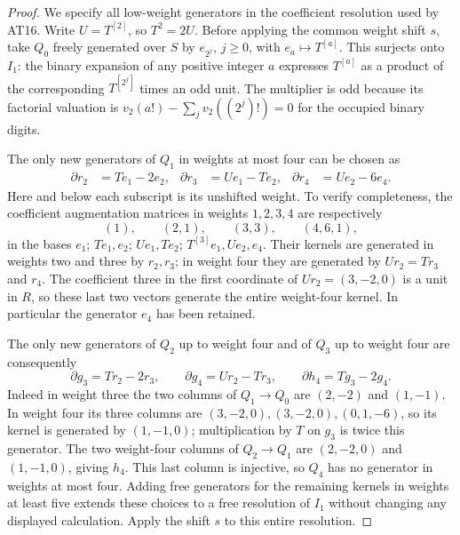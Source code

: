 \begin{proof}
We specify all low-weight generators in the
coefficient resolution used by AT16.  Write
$U=T^{[2]}$, so $T^2=2U$.
Before applying the common weight shift $s$, take
$Q_0$ freely generated over $S$ by $e_{2^j}$,
$j\geq0$, with $e_a\mapsto T^{[a]}$.
This surjects onto $I_1$: the binary expansion of
any positive integer $a$ expresses $T^{[a]}$ as
a product of the corresponding $T^{[2^j]}$
times an odd unit.  The multiplier is odd because
its factorial valuation is
$v_2(a!)-\sum_jv_2((2^j)!)=0$ for the occupied
binary digits.

The only new generators of $Q_1$ in weights at
most four can be chosen as
\[
 \begin{aligned}
 \partial r_2&=Te_1-2e_2,&
 \partial r_3&=Ue_1-Te_2,&
 \partial r_4&=Ue_2-6e_4.
 \end{aligned}                                      \tag{AL.57}
\]
Here and below each subscript is its unshifted
weight.  To verify completeness, the coefficient
augmentation matrices in weights $1,2,3,4$ are
respectively
\[
 (1),\qquad(2,1),\qquad(3,3),\qquad(4,6,1),
 \tag{AL.58}
\]
in the bases
$e_1$;
$Te_1,e_2$;
$Ue_1,Te_2$;
$T^{[3]}e_1,Ue_2,e_4$.
Their kernels are generated in weights two and
three by $r_2,r_3$; in weight four they are generated
by $Ur_2=Tr_3$ and $r_4$.
The coefficient three in the first coordinate of
$Ur_2=(3,-2,0)$ is a unit in $R$, so these last
two vectors generate the entire weight-four kernel.
In particular the generator $e_4$ has been retained.

The only new generators of $Q_2$ up to weight four
and of $Q_3$ up to weight four are consequently
\[
 \partial g_3=Tr_2-2r_3,
 \qquad\partial g_4=Ur_2-Tr_3,
 \qquad\partial h_4=Tg_3-2g_4.                       \tag{AL.59}
\]
Indeed in weight three the two columns of
$Q_1\to Q_0$ are $(2,-2)$ and $(1,-1)$.
In weight four its three columns are
$(3,-2,0),(3,-2,0),(0,1,-6)$, so its kernel
is generated by $(1,-1,0)$; multiplication by
$T$ on $g_3$ is twice this generator.
The two weight-four columns of $Q_2\to Q_1$
are $(2,-2,0)$ and $(1,-1,0)$, giving $h_4$.
This last column is injective, so $Q_4$ has no
generator in weights at most four.
Adding free generators for the remaining kernels
in weights at least five extends these choices
to a free resolution of $I_1$ without changing
any displayed calculation.  Apply the shift $s$
to this entire resolution.


\end{proof}
